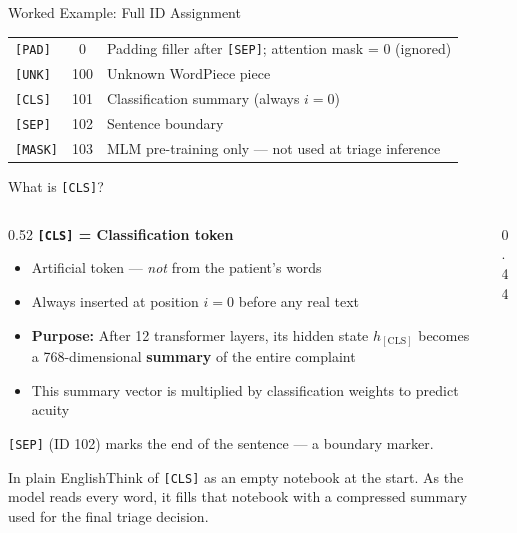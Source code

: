 \documentclass[10pt,aspectratio=169]{beamer}
\newcommand{\plain}[1]{\begin{block}{In plain English}\footnotesize #1\end{block}}
\begin{document}
\begin{frame}{Worked Example: Full ID Assignment}
\begin{tabular}{@{}l c p{7.4cm}@{}}
		\midrule
		\texttt{[PAD]} & 0 & Padding filler after \texttt{[SEP]}; attention mask = 0 (ignored) \\
		\texttt{[UNK]} & 100 & Unknown WordPiece piece \\
		\texttt{[CLS]} & 101 & Classification summary (always $i=0$) \\
		\texttt{[SEP]} & 102 & Sentence boundary \\
		\texttt{[MASK]} & 103 & MLM pre-training only --- not used at triage inference \\
		\bottomrule
	\end{tabular}
\end{frame}

\begin{frame}{What is \texttt{[CLS]}?}
	\begin{columns}[T]
		\begin{column}{0.52\textwidth}
			\small
			\textbf{\texttt{[CLS]} = Classification token}
			\begin{itemize}
				\item Artificial token --- \textit{not} from the patient's words
				\item Always inserted at position $i = 0$ before any real text
				\item \textbf{Purpose:} After 12 transformer layers, its hidden state $h_{\mathrm{[CLS]}}$ becomes a 768-dimensional \textbf{summary} of the entire complaint
				\item This summary vector is multiplied by classification weights to predict acuity
			\end{itemize}
			\vspace{0.1cm}
			\texttt{[SEP]} (ID 102) marks the end of the sentence --- a boundary marker.
			\plain{Think of \texttt{[CLS]} as an empty notebook at the start. As the model reads every word, it fills that notebook with a compressed summary used for the final triage decision.}
		\end{column}
		\begin{column}{0.44\textwidth}
			\centering
\end{column}
\end{columns}
\end{frame}
\end{document}
